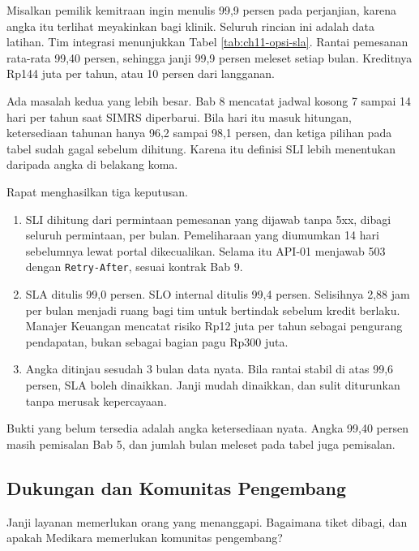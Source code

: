 \begin{kasus}[title={Kasus Medikara Health: Janji 99,9 Persen yang Tidak Dapat Ditepati}]
Misalkan pemilik kemitraan ingin menulis 99,9 persen pada perjanjian, karena angka itu terlihat meyakinkan bagi klinik. Seluruh rincian ini adalah data
latihan. Tim integrasi menunjukkan Tabel \ref{tab:ch11-opsi-sla}. Rantai pemesanan rata-rata 99,40 persen, sehingga janji 99,9 persen meleset setiap
bulan. Kreditnya Rp144 juta per tahun, atau 10 persen dari langganan.

Ada masalah kedua yang lebih besar. Bab 8 mencatat jadwal kosong 7 sampai 14 hari per tahun saat SIMRS diperbarui. Bila hari itu masuk hitungan,
ketersediaan tahunan hanya 96,2 sampai 98,1 persen, dan ketiga pilihan pada tabel sudah gagal sebelum dihitung. Karena itu definisi SLI lebih menentukan
daripada angka di belakang koma.

Rapat menghasilkan tiga keputusan.
\begin{enumerate}
  \item SLI dihitung dari permintaan pemesanan yang dijawab tanpa 5xx, dibagi seluruh permintaan, per bulan. Pemeliharaan yang diumumkan 14 hari sebelumnya
        lewat portal dikecualikan. Selama itu API-01 menjawab 503 dengan \texttt{Retry-After}, sesuai kontrak Bab 9.
  \item SLA ditulis 99,0 persen. SLO internal ditulis 99,4 persen. Selisihnya 2,88 jam per bulan menjadi ruang bagi tim untuk bertindak sebelum kredit
        berlaku. Manajer Keuangan mencatat risiko Rp12 juta per tahun sebagai pengurang pendapatan, bukan sebagai bagian pagu Rp300 juta.
  \item Angka ditinjau sesudah 3 bulan data nyata. Bila rantai stabil di atas 99,6 persen, SLA boleh dinaikkan. Janji mudah dinaikkan, dan sulit diturunkan
        tanpa merusak kepercayaan.
\end{enumerate}

Bukti yang belum tersedia adalah angka ketersediaan nyata. Angka 99,40 persen masih pemisalan Bab 5, dan jumlah bulan meleset pada tabel juga pemisalan.
\end{kasus}

\subsection{Dukungan dan Komunitas Pengembang}

Janji layanan memerlukan orang yang menanggapi. Bagaimana tiket dibagi, dan apakah Medikara memerlukan komunitas pengembang?

